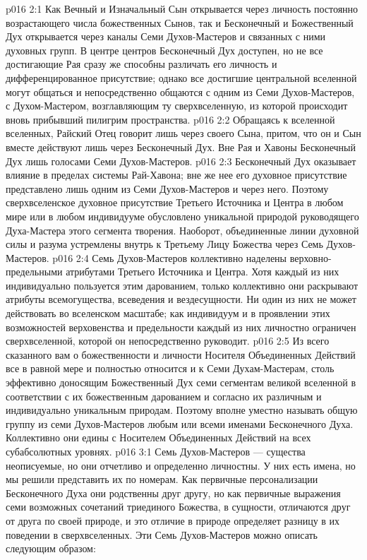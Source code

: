 \vs p016 2:1 Как Вечный и Изначальный Сын открывается через личность постоянно возрастающего числа божественных Сынов, так и Бесконечный и Божественный Дух открывается через каналы Семи Духов\hyp{}Мастеров и связанных с ними духовных групп. В центре центров Бесконечный Дух доступен, но не все достигающие Рая сразу же способны различать его личность и дифференцированное присутствие; однако все достигшие центральной вселенной могут общаться и непосредственно общаются с одним из Семи Духов\hyp{}Мастеров, с Духом\hyp{}Мастером, возглавляющим ту сверхвселенную, из которой происходит вновь прибывший пилигрим пространства.
\vs p016 2:2 Обращаясь к вселенной вселенных, Райский Отец говорит лишь через своего Сына, притом, что он и Сын вместе действуют лишь через Бесконечный Дух. Вне Рая и Хавоны Бесконечный Дух  лишь голосами Семи Духов\hyp{}Мастеров.
\vs p016 2:3 \pc Бесконечный Дух оказывает влияние  в пределах системы Рай\hyp{}Хавона; вне же нее его духовное присутствие представлено лишь одним из Семи Духов\hyp{}Мастеров и через него. Поэтому сверхвселенское духовное присутствие Третьего Источника и Центра в любом мире или в любом индивидууме обусловлено уникальной природой руководящего Духа\hyp{}Мастера этого сегмента творения. Наоборот, объединенные линии духовной силы и разума устремлены внутрь к Третьему Лицу Божества через Семь Духов\hyp{}Мастеров.
\vs p016 2:4 \pc Семь Духов\hyp{}Мастеров коллективно наделены верховно\hyp{}предельными атрибутами Третьего Источника и Центра. Хотя каждый из них индивидуально пользуется этим дарованием, только коллективно они раскрывают атрибуты всемогущества, всеведения и вездесущности. Ни один из них не может действовать во вселенском масштабе; как индивидуум и в проявлении этих возможностей верховенства и предельности каждый из них личностно ограничен сверхвселенной, которой он непосредственно руководит.
\vs p016 2:5 Из всего сказанного вам о божественности и личности Носителя Объединенных Действий все в равной мере и полностью относится и к Семи Духам\hyp{}Мастерам, столь эффективно доносящим Божественный Дух семи сегментам великой вселенной в соответствии с их божественным дарованием и согласно их различным и индивидуально уникальным природам. Поэтому вполне уместно называть общую группу из семи Духов\hyp{}Мастеров любым или всеми именами Бесконечного Духа. Коллективно они едины с Носителем Объединенных Действий на всех субабсолютных уровнях.
\vs p016 3:1 Семь Духов\hyp{}Мастеров --- существа неописуемые, но они отчетливо и определенно личностны. У них есть имена, но мы решили представить их по номерам. Как первичные персонализации Бесконечного Духа они родственны друг другу, но как первичные выражения семи возможных сочетаний триединого Божества, в сущности, отличаются друг от друга по своей природе, и это отличие в природе определяет разницу в их поведении в сверхвселенных. Эти Семь Духов\hyp{}Мастеров можно описать следующим образом:
